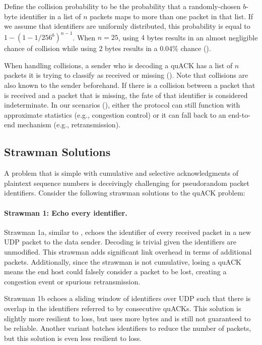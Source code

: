 Define the collision probability to be the probability that a randomly-chosen
$b$-byte identifier in a list of $n$ packets maps to more than one packet in
that list.
If we assume that identifiers are uniformly distributed,
this probability is equal to $1-(1 - 1/256^{b})^{n-1}$.
When $n=25$, using $4$ bytes results in an almost negligible chance of
collision while using $2$ bytes results in a 0.04\% chance
().


When handling collisions, a sender who is decoding a quACK has a list of $n$ packets it is
trying to classify as received or missing ().
Note that collisions are also known
to the sender beforehand. If there is a collision between
a packet that is received and a packet that is missing, the fate of that
identifier is considered indeterminate.
In our scenarios (), either the
protocol can still function
with approximate statistics (e.g., congestion control)
or it can fall back to an end-to-end mechanism (e.g., retransmission).

\subsection{Strawman Solutions}



A problem that is simple with cumulative and selective acknowledgments of
plaintext sequence numbers is deceivingly challenging for pseudorandom
packet identifiers. Consider the following strawman solutions to the quACK
problem:

\paragraph{Strawman 1: Echo every identifier.}
Strawman 1a, similar to \cite{li-tsvwg-loops-problem-opportunities-06,kramer2020lwpep},
echoes the identifier of every received packet in a new UDP packet to the data
sender.  Decoding is trivial given the identifiers are unmodified.
This strawman adds significant link overhead in terms of additional packets.
Additionally, since the strawman is not cumulative, losing a quACK means the
end host could falsely consider a packet to be lost, creating a congestion
event or spurious retransmission.

Strawman 1b echoes a sliding window of identifiers over UDP such that there is overlap
in the identifiers referred to by consecutive quACKs.
This solution is slightly more resilient to loss, but uses more bytes and is
still not guaranteed to be reliable.
Another variant batches identifiers to reduce the number of packets, but this
solution is even less resilient to loss.

